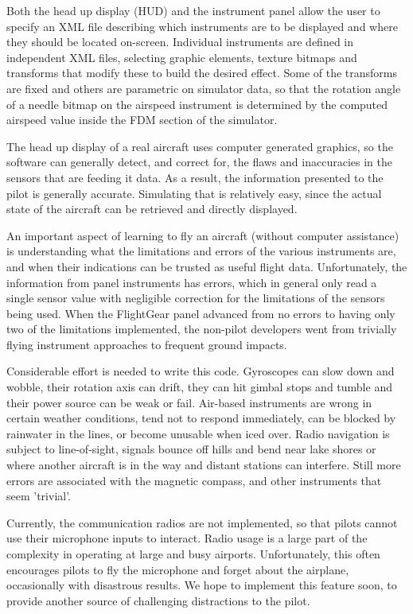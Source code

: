 \documentclass[a4paper,10pt]{article}
\begin{document}
Both the head up display (HUD) and the instrument panel allow
the user to specify an XML file describing which instruments
are to be displayed and where they should be located on-screen.
Individual instruments are defined in independent XML files,
selecting graphic elements, texture bitmaps and transforms that modify
these to build the desired effect.  Some of the transforms are fixed
and others are parametric on simulator data, so that the rotation 
angle of a needle bitmap on the airspeed instrument is determined
by the computed airspeed value inside the FDM section of the simulator.

%
The head up display of a real aircraft uses computer generated
graphics, so the software can generally detect, and correct for,
the flaws and inaccuracies in the sensors that are feeding it data.
As a result, the information presented to the pilot is generally
accurate.  Simulating that is relatively easy, since the actual
state of the aircraft can be retrieved and directly displayed.

An important aspect of learning
to fly an aircraft (without computer assistance) is understanding
what the limitations and errors of the various instruments are,
and when their indications can be trusted as useful flight data.
Unfortunately, the information from panel instruments has errors,
which in general only read a single sensor value
with negligible correction for the
limitations of the sensors being used.  
When the FlightGear panel advanced from no errors to having only
two of the limitations implemented, the non-pilot developers went
from trivially flying instrument approaches to frequent ground impacts.

Considerable effort is needed to write this code.  Gyroscopes can
slow down and wobble, their rotation axis can drift, they can hit
gimbal stops and tumble and their power source can be weak or fail.
Air-based instruments are wrong in certain weather conditions,
tend not to respond immediately, can be blocked by rainwater in the
lines, or become unusable when iced over.  Radio navigation is
subject to line-of-sight, signals bounce off hills and bend near
lake shores or where another aircraft is in the way and
distant stations can interfere.  Still more errors are associated
with the magnetic compass, and other instruments that seem 'trivial'.

Currently, the communication radios are not implemented, so that pilots
cannot use their microphone inputs to interact.  Radio usage is a large
part of the complexity in operating at large and busy airports.
Unfortunately, this often
encourages pilots to fly the microphone and forget about the airplane,
occasionally with disastrous results.  We hope to implement this feature
soon, to provide another source of challenging distractions to the pilot.
%
%
\end{document}
